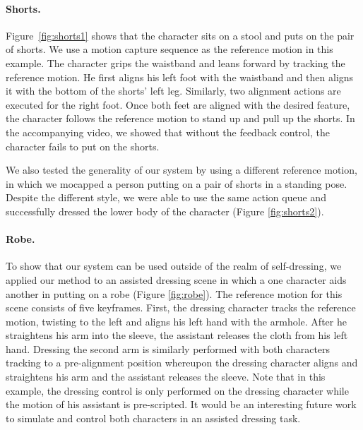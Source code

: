 \paragraph{Shorts.} Figure~\ref{fig:shorts1} shows that the character sits on a stool and puts on the pair of shorts. We use a motion capture sequence as the reference motion in this example. The character grips the waistband and leans forward by tracking the reference motion. He first aligns his left foot with the waistband and then aligns it with the bottom of the shorts' left leg. Similarly, two alignment actions are executed for the right foot. Once both feet are aligned with the desired feature, the character follows the reference motion to stand up and pull up the shorts. In the accompanying video, we showed that without the feedback control, the character fails to put on the shorts.

We also tested the generality of our system by using a different reference motion, in which we mocapped a person putting on a pair of shorts in a standing pose. Despite the different style, we were able to use the same action queue and successfully dressed the lower body of the character (Figure \ref{fig:shorts2}).

\paragraph{Robe.} To show that our system can be used outside of the realm of self-dressing, we applied our method to an assisted dressing scene in which a one character aids another in putting on a robe (Figure \ref{fig:robe}). The reference motion for this scene consists of five keyframes. First, the dressing character tracks the reference motion, twisting to the left and aligns his left hand with the armhole. After he straightens his arm into the sleeve, the assistant releases the cloth from his left hand. Dressing the second arm is similarly performed with both characters tracking to a pre-alignment position whereupon the dressing character aligns and straightens his arm and the assistant releases the sleeve. Note that in this example, the dressing control is only performed on the dressing character while the motion of his assistant is pre-scripted. It would be an interesting future work to simulate and control both characters in an assisted dressing task.
